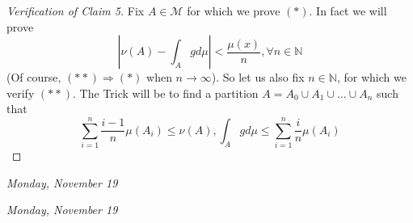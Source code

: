 \documentclass[letterpaper, 12pt]{article}
\newcommand{\cM}{\mathcal{M}}
\newcommand{\bN}{\mathbb{N}}
\theoremstyle{stdthm}
\theoremstyle{stddef}
\theoremstyle{stdnonum}
\theoremstyle{stdqands}
\theoremstyle{stdbold}
\begin{document}
\begin{proof}[Verification of Claim 5]
Fix $A \in \cM$ for which we prove $(*)$. In fact we will prove 
\[\tag{$**$} \left| \nu(A) - \int_A g d\mu \right| < \frac{\mu(x)}{n},\forall n \in \bN \]
(Of course, $(**)\Longrightarrow (*)$ when $n\to \infty$). So let us also fix $n\in \bN$, for which we verify $(**)$. The Trick will be to find a partition $A = A_0 \cup A_1 \cup \dots \cup A_n$ such that 
\[ \sum_{i=1}^n \frac{i-1}{n} \mu(A_i) \leq \nu(A) , \int_A g d \mu \leq \sum_{i=1}^n \frac{i}{n} \mu(A_i) \]
\end{proof}



\begin{center}
\emph{Monday, November 19}
\end{center}


\begin{center}
\emph{Monday, November 19}
\end{center}
\end{document}
